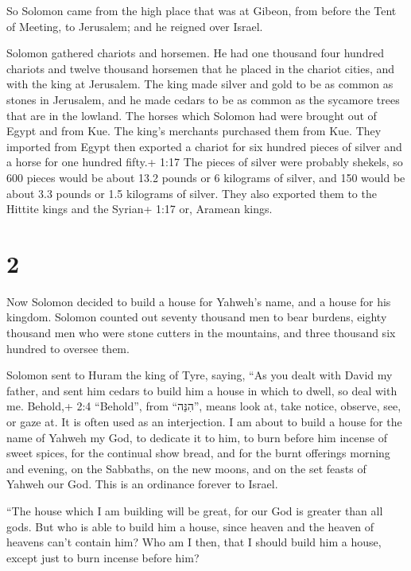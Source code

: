  So Solomon came from the high place that was at Gibeon,
from before the Tent of Meeting, to Jerusalem; and he reigned over
Israel.

 Solomon gathered chariots and horsemen. He had one
thousand four hundred chariots and twelve thousand horsemen that he
placed in the chariot cities, and with the king at Jerusalem.
 The king made silver and gold to be as common as stones in
Jerusalem, and he made cedars to be as common as the sycamore trees that
are in the lowland.  The horses which Solomon had were
brought out of Egypt and from Kue. The king's merchants purchased them
from Kue.  They imported from Egypt then exported a chariot
for six hundred pieces of silver and a horse for one hundred fifty.+
1:17 The pieces of silver were probably shekels, so 600 pieces would be
about 13.2 pounds or 6 kilograms of silver, and 150 would be about 3.3
pounds or 1.5 kilograms of silver. They also exported them to the
Hittite kings and the Syrian+ 1:17 or, Aramean kings.

\hypertarget{section-1}{%
\section{2}\label{section-1}}

 Now Solomon decided to build a house for Yahweh's name, and
a house for his kingdom.  Solomon counted out seventy
thousand men to bear burdens, eighty thousand men who were stone cutters
in the mountains, and three thousand six hundred to oversee them.

 Solomon sent to Huram the king of Tyre, saying, ``As you
dealt with David my father, and sent him cedars to build him a house in
which to dwell, so deal with me.  Behold,+ 2:4 ``Behold'',
from ``הִנֵּה'', means look at, take notice, observe, see, or gaze at.
It is often used as an interjection. I am about to build a house for the
name of Yahweh my God, to dedicate it to him, to burn before him incense
of sweet spices, for the continual show bread, and for the burnt
offerings morning and evening, on the Sabbaths, on the new moons, and on
the set feasts of Yahweh our God. This is an ordinance forever to
Israel.

 ``The house which I am building will be great, for our God
is greater than all gods.  But who is able to build him a
house, since heaven and the heaven of heavens can't contain him? Who am
I then, that I should build him a house, except just to burn incense
before him?

